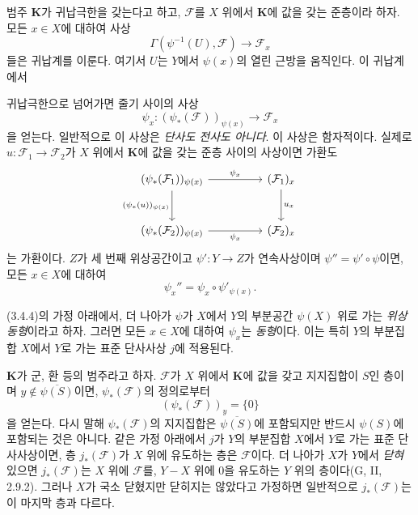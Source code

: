 \begin{env}[3.4.4]
\label{0.3.4.4-ko}
범주 $\mathbf K$가 귀납극한을 갖는다고 하고, $\mathcal F$를 $X$ 위에서 $\mathbf K$에 값을 갖는 준층이라 하자. 모든 $x\in X$에 대하여 사상
\[
  \Gamma(\psi^{-1}(U),\mathcal F)
  \longrightarrow\mathcal F_x
\]
들은 귀납계를 이룬다. 여기서 $U$는 $Y$에서 $\psi(x)$의 열린 근방을 움직인다. 이 귀납계에서


귀납극한으로 넘어가면 줄기 사이의 사상
\[
  \psi_x:(\psi_*(\mathcal F))_{\psi(x)}
  \longrightarrow\mathcal F_x
\]
을 얻는다. 일반적으로 이 사상은 \emph{단사도 전사도 아니다}. 이 사상은 함자적이다. 실제로 $u:\mathcal F_1\to\mathcal F_2$가 $X$ 위에서 $\mathbf K$에 값을 갖는 준층 사이의 사상이면 가환도
\[
\begin{tikzcd}[column sep=huge,row sep=large]
(\psi_*(\mathcal F_1))_{\psi(x)}
  \arrow[r,"\psi_x"] \arrow[d,"{(\psi_*(u))_{\psi(x)}}"']
  & (\mathcal F_1)_x \arrow[d,"u_x"] \\
(\psi_*(\mathcal F_2))_{\psi(x)}
  \arrow[r,"\psi_x"']
  & (\mathcal F_2)_x
\end{tikzcd}
\]
는 가환이다. $Z$가 세 번째 위상공간이고 $\psi':Y\to Z$가 연속사상이며 $\psi''=\psi'\circ\psi$이면, 모든 $x\in X$에 대하여
\[
  \psi_x''=\psi_x\circ\psi'_{\psi(x)}.
\]
\end{env}

\begin{env}[3.4.5]
\label{0.3.4.5-ko}
(3.4.4)의 가정 아래에서, 더 나아가 $\psi$가 $X$에서 $Y$의 부분공간 $\psi(X)$ 위로 가는 \emph{위상동형}이라고 하자. 그러면 모든 $x\in X$에 대하여 $\psi_x$는 \emph{동형}이다. 이는 특히 $Y$의 부분집합 $X$에서 $Y$로 가는 표준 단사사상 $j$에 적용된다.
\end{env}

\begin{env}[3.4.6]
\label{0.3.4.6-ko}
$\mathbf K$가 군, 환 등의 범주라고 하자. $\mathcal F$가 $X$ 위에서 $\mathbf K$에 값을 갖고 지지집합이 $S$인 층이며 $y\notin\overline{\psi(S)}$이면, $\psi_*(\mathcal F)$의 정의로부터
\[
  (\psi_*(\mathcal F))_y=\{0\}
\]
을 얻는다. 다시 말해 $\psi_*(\mathcal F)$의 지지집합은 $\overline{\psi(S)}$에 포함되지만 반드시 $\psi(S)$에 포함되는 것은 아니다. 같은 가정 아래에서 $j$가 $Y$의 부분집합 $X$에서 $Y$로 가는 표준 단사사상이면, 층 $j_*(\mathcal F)$가 $X$ 위에 유도하는 층은 $\mathcal F$이다. 더 나아가 $X$가 $Y$에서 \emph{닫혀} 있으면 $j_*(\mathcal F)$는 $X$ 위에 $\mathcal F$를, $Y-X$ 위에 $0$을 유도하는 $Y$ 위의 층이다(G, II, 2.9.2). 그러나 $X$가 국소 닫혔지만 닫히지는 않았다고 가정하면 일반적으로 $j_*(\mathcal F)$는 이 마지막 층과 다르다.
\end{env}

